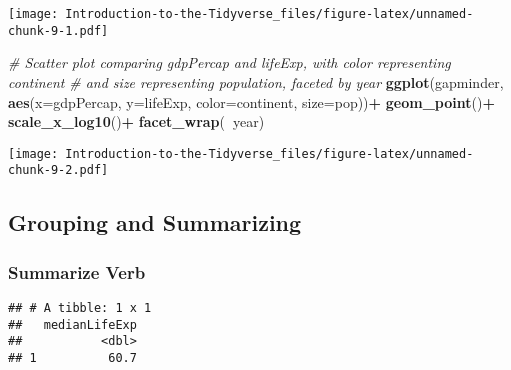\documentclass[
]{article}
\newenvironment{Shaded}{\begin{snugshade}}{\end{snugshade}}
\newcommand{\CommentTok}[1]{\textcolor[rgb]{0.56,0.35,0.01}{\textit{#1}}}
\newcommand{\DataTypeTok}[1]{\textcolor[rgb]{0.13,0.29,0.53}{#1}}
\newcommand{\DecValTok}[1]{\textcolor[rgb]{0.00,0.00,0.81}{#1}}
\newcommand{\KeywordTok}[1]{\textcolor[rgb]{0.13,0.29,0.53}{\textbf{#1}}}
\newcommand{\NormalTok}[1]{#1}
\newcommand{\OperatorTok}[1]{\textcolor[rgb]{0.81,0.36,0.00}{\textbf{#1}}}
\newcommand{\StringTok}[1]{\textcolor[rgb]{0.31,0.60,0.02}{#1}}
\begin{document}
\texttt{[image: Introduction-to-the-Tidyverse\_files/figure-latex/unnamed-chunk-9-1.pdf]}

\begin{Shaded}
\begin{Highlighting}[]
\CommentTok{# Scatter plot comparing gdpPercap and lifeExp, with color representing continent}
\CommentTok{# and size representing population, faceted by year}
\KeywordTok{ggplot}\NormalTok{(gapminder, }\KeywordTok{aes}\NormalTok{(}\DataTypeTok{x=}\NormalTok{gdpPercap, }\DataTypeTok{y=}\NormalTok{lifeExp, }\DataTypeTok{color=}\NormalTok{continent, }\DataTypeTok{size=}\NormalTok{pop))}\OperatorTok{+}
\KeywordTok{geom_point}\NormalTok{()}\OperatorTok{+}
\KeywordTok{scale_x_log10}\NormalTok{()}\OperatorTok{+}
\KeywordTok{facet_wrap}\NormalTok{(}\OperatorTok{~}\NormalTok{year)}
\end{Highlighting}
\end{Shaded}

\texttt{[image: Introduction-to-the-Tidyverse\_files/figure-latex/unnamed-chunk-9-2.pdf]}

\hypertarget{grouping-and-summarizing}{%
\subsection{Grouping and Summarizing}\label{grouping-and-summarizing}}

\hypertarget{summarize-verb}{%
\subsubsection{Summarize Verb}\label{summarize-verb}}

\begin{Shaded}
\end{Shaded}

\begin{verbatim}
## # A tibble: 1 x 1
##   medianLifeExp
##           <dbl>
## 1          60.7
\end{verbatim}

\begin{Shaded}
\end{Shaded}
\end{document}
